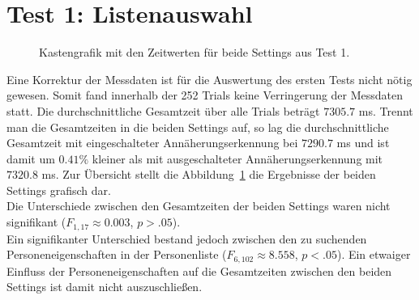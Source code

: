 \documentclass[12pt,numbers=noenddot,parskip,bibliography=totocnumbered,listof=totocnumbered]{scrreprt}
\begin{document}
\section{Test 1: Listenauswahl}
\begin{figure}
\centering
\caption{Kastengrafik mit den Zeitwerten für beide Settings aus Test 1.}
\label{ergebnistest1}
\end{figure}
Eine Korrektur der Messdaten ist für die Auswertung des ersten Tests nicht nötig gewesen. Somit fand innerhalb der 252 Trials keine Verringerung der Messdaten statt. Die durchschnittliche Gesamtzeit über alle Trials beträgt $7305.7$ ms. Trennt man die Gesamtzeiten in die beiden Settings auf, so lag die durchschnittliche Gesamtzeit mit eingeschalteter Annäherungserkennung bei $7290.7$ ms und ist damit um $0.41\%$ kleiner als mit ausgeschalteter Annäherungserkennung mit $7320.8$ ms. Zur Übersicht stellt die Abbildung~\ref{ergebnistest1} die Ergebnisse der beiden Settings grafisch dar.\\
Die Unterschiede zwischen den Gesamtzeiten der beiden Settings waren nicht signifikant ($F_{1,17}\approx 0.003$, $p > .05$).\\
Ein signifikanter Unterschied bestand jedoch zwischen den zu suchenden Personeneigenschaften in der Personenliste ($F_{6,102}\approx 8.558$, $p < .05$). Ein etwaiger Einfluss der Personeneigenschaften auf die Gesamtzeiten zwischen den beiden Settings ist damit nicht auszuschließen.
\end{document}

